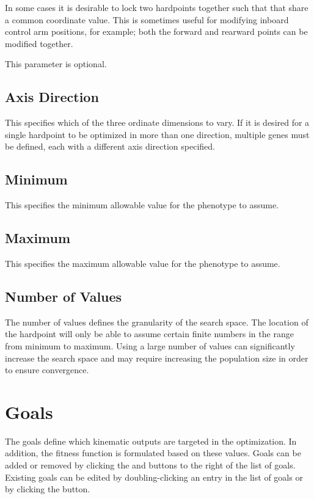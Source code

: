In some cases it is desirable to lock two hardpoints together such that that share a common coordinate value.  This is sometimes useful for modifying inboard control arm positions, for example; both the forward and rearward points can be modified together.

This parameter is optional.

\subsection{Axis Direction} \label{ssec:genesAxisDirection}

This specifies which of the three ordinate dimensions to vary.  If it is desired for a single hardpoint to be optimized in more than one direction, multiple genes must be defined, each with a different axis direction specified.

\subsection{Minimum} \label{ssec:genesMinimum}

This specifies the minimum allowable value for the phenotype to assume.

\subsection{Maximum} \label{ssec:genesMaximum}

This specifies the maximum allowable value for the phenotype to assume.

\subsection{Number of Values} \label{ssec:genesNumberOfValues}

The number of values defines the granularity of the search space.  The location of the hardpoint will only be able to assume certain finite numbers in the range from minimum to maximum.  Using a large number of values can significantly increase the search space and may require increasing the population size in order to ensure convergence.

\section{Goals} \label{sec:goals}

The goals define which kinematic outputs are targeted in the optimization.  In addition, the fitness function is formulated based on these values.  Goals can be added or removed by clicking the  and  buttons to the right of the list of goals.  Existing goals can be edited by doubling-clicking an entry in the list of goals or by clicking the  button.

